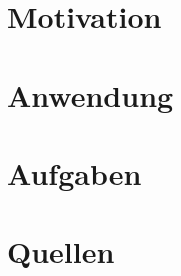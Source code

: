 \documentclass[]{beamer}
\begin{document}
\section{Motivation}




\section{Anwendung}




% 

\section{Aufgaben}


\section*{Quellen}

\end{document}
